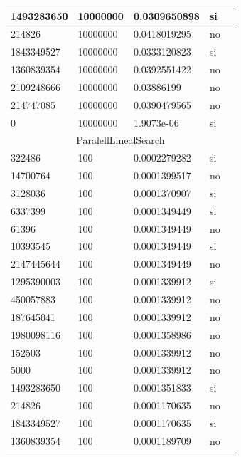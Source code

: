 \documentclass[12pt, fleqn]{article}                             %
\theoremstyle{break}                                            %
\begin{document}
\begin{longtable}{|m{5em}|m{5em}|m{10em}|m{5em}|@{}m{0pt}@{}}
            1493283650& 10000000  & 0.0309650898 & si &\\[1em]    \hline
            214826& 10000000  & 0.0418019295 & no &\\[1em]    \hline
            1843349527& 10000000  & 0.0333120823 & si &\\[1em]    \hline
            1360839354& 10000000  & 0.0392551422 & no &\\[1em]    \hline
            2109248666& 10000000  & 0.03886199 & no &\\[1em]    \hline
            214747085& 10000000  & 0.0390479565 & no &\\[1em]    \hline
            0& 10000000  & 1.9073e-06 & si &\\[1em]    \hline
            \multicolumn{5}{|c|}{ParalellLinealSearch}   \\          \hline
            322486& 100  & 0.0002279282 & si &\\[1em]    \hline
            14700764& 100  & 0.0001399517 & no &\\[1em]    \hline
            3128036& 100  & 0.0001370907 & si &\\[1em]    \hline
            6337399& 100  & 0.0001349449 & si &\\[1em]    \hline
            61396& 100  & 0.0001349449 & no &\\[1em]    \hline
            10393545& 100  & 0.0001349449 & si &\\[1em]    \hline
            2147445644& 100  & 0.0001349449 & no &\\[1em]    \hline
            1295390003& 100  & 0.0001339912 & si &\\[1em]    \hline
            450057883& 100  & 0.0001339912 & no &\\[1em]    \hline
            187645041& 100  & 0.0001339912 & no &\\[1em]    \hline
            1980098116& 100  & 0.0001358986 & no &\\[1em]    \hline
            152503& 100  & 0.0001339912 & no &\\[1em]    \hline
            5000& 100  & 0.0001339912 & no &\\[1em]    \hline
            1493283650& 100  & 0.0001351833 & si &\\[1em]    \hline
            214826& 100  & 0.0001170635 & no &\\[1em]    \hline
            1843349527& 100  & 0.0001170635 & si &\\[1em]    \hline
            1360839354& 100  & 0.0001189709 & no &\\[1em]    \hline

\end{longtable}
\end{document}
